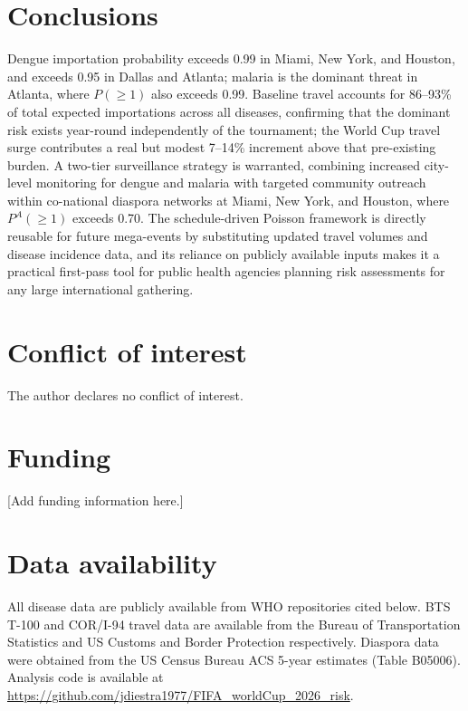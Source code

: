 \documentclass[12pt, a4paper]{article}
\begin{document}
\section{Conclusions}

Dengue importation probability exceeds 0.99 in Miami, New York, and
Houston, and exceeds 0.95 in Dallas and Atlanta; malaria is the
dominant threat in Atlanta, where $P(\geq 1)$ also exceeds 0.99.
Baseline travel accounts for 86--93\% of total expected importations
across all diseases, confirming that the dominant risk exists
year-round independently of the tournament; the World Cup travel
surge contributes a real but modest 7--14\% increment above that
pre-existing burden. A two-tier surveillance strategy is warranted,
combining increased city-level monitoring for dengue and malaria
with targeted community outreach within co-national diaspora
networks at Miami, New York, and Houston, where $P^A(\geq 1)$
exceeds 0.70. The schedule-driven Poisson framework
is directly reusable for future mega-events by substituting updated
travel volumes and disease incidence data, and its reliance on
publicly available inputs makes it a practical first-pass tool for
public health agencies planning risk assessments for any large
international gathering.

\section*{Conflict of interest}
The author declares no conflict of interest.

\section*{Funding}
[Add funding information here.]

\section*{Data availability}
All disease data are publicly available from WHO repositories cited
below. BTS T-100 and COR/I-94 travel data are available from the
Bureau of Transportation Statistics and US Customs and Border
Protection respectively. Diaspora data were obtained from the
US Census Bureau ACS 5-year estimates (Table B05006).
Analysis code is available at \url{https://github.com/jdiestra1977/FIFA\_worldCup\_2026\_risk}.
\end{document}
